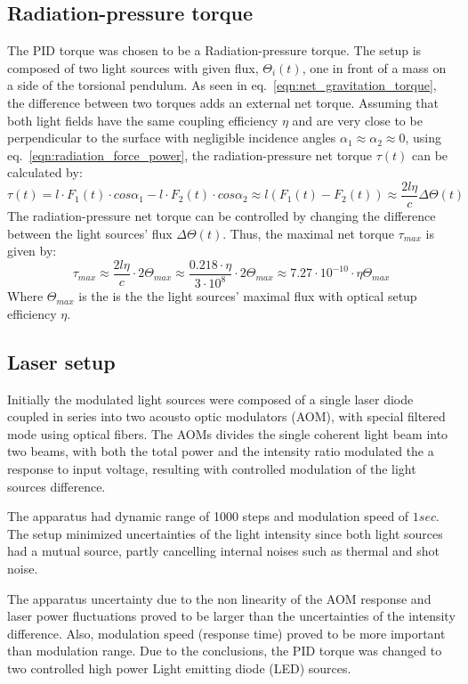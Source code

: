 \documentclass[\main/master.tex]{subfiles}
\begin{document}
\subsection{Radiation-pressure torque}
The PID torque was chosen to be a Radiation-pressure torque. The setup is composed of two light sources with given flux, $\Theta_i(t)$, one in front of a mass on a side of the torsional pendulum. As seen in eq.~\ref{eqn:net_gravitation_torque}, the difference between two torques adds an external net torque. Assuming that both light fields have the same coupling efficiency $\eta$ and are very close to be perpendicular to the surface with negligible incidence angles $\alpha_1\approx\alpha_2\approx 0$, using eq.~\ref{eqn:radiation_force_power}, the radiation-pressure net torque $\tau(t)$ can be calculated by:  
\begin{equation}
\tau(t) = l\cdot F_1(t) \cdot cos\alpha_1 - l\cdot F_2(t) \cdot cos\alpha_2\approx l(F_1(t) - F_2(t)) \approx \frac{2l\eta}{{c}} \Delta \Theta(t) \label{eqn:radiation torque}
\end{equation}
The radiation-pressure net torque can be controlled by changing the difference between the light sources' flux $\Delta \Theta(t)$. Thus, the maximal net torque $\tau_{max}$ is given by: 
\begin{equation}
\tau_{max}  \approx \frac{2l\eta}{{c}} \cdot 2 \Theta_{max} \approx \frac{0.218\cdot \eta}{{3\cdot10^{8}}} \cdot 2 \Theta_{max} \approx 7.27\cdot10^{-10} \cdot \eta\Theta_{max}   \label{eqn:max radiation torque}
\end{equation}
Where $\Theta_{max}$ is the is the the light sources' maximal flux with optical setup efficiency $\eta$. 
\subsection{Laser setup}
Initially the modulated light sources were composed of a single laser diode coupled in series into two acousto optic modulators (AOM), with special filtered mode using optical fibers. The AOMs divides the single coherent light beam into two beams, with both the total power and the intensity ratio modulated the a response to input voltage, resulting with controlled modulation of the light sources difference.
\par\noindent
The apparatus had dynamic range of 1000 steps and modulation speed of $1 sec$. The setup minimized uncertainties of the light intensity since both light sources had a mutual source, partly cancelling internal noises such as thermal and shot noise. 
\par\noindent
The apparatus uncertainty due to the non linearity of the AOM response and laser power fluctuations proved to be larger than the uncertainties of the intensity difference. Also, modulation speed (response time) proved to be more important than modulation range. Due to the conclusions, the PID torque was changed to two controlled high power Light emitting diode (LED) sources.
\end{document}
